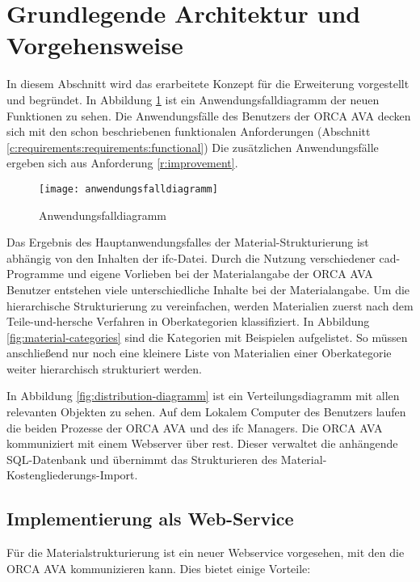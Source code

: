 \section{Grundlegende Architektur und Vorgehensweise}
\label{c:conception:architecture}
In diesem Abschnitt wird das erarbeitete Konzept für die Erweiterung vorgestellt und begründet. In Abbildung \ref{fig:usecasediagramm} ist ein Anwendungsfalldiagramm der neuen Funktionen zu sehen. Die Anwendungsfälle des Benutzers der ORCA AVA decken sich mit den schon beschriebenen funktionalen Anforderungen (Abschnitt \ref{c:requirements:requirements:functional}) Die zusätzlichen Anwendungsfälle ergeben sich aus Anforderung \ref{r:improvement}.

\begin{figure}[h]
	\centering
	\texttt{[image: anwendungsfalldiagramm]}
	\caption[Anwendungsfalldiagramm]{Anwendungsfalldiagramm}
	\label{fig:usecasediagramm}
\end{figure}

Das Ergebnis des Hauptanwendungsfalles der Material-Strukturierung ist abhängig von den Inhalten der \ac{ifc}-Datei. Durch die Nutzung verschiedener \ac{cad}-Programme und eigene Vorlieben bei der Materialangabe der ORCA AVA Benutzer entstehen viele unterschiedliche Inhalte bei der Materialangabe.
Um die hierarchische Strukturierung zu vereinfachen, werden Materialien zuerst nach dem \glqq Teile-und-hersche\grqq{} Verfahren in Oberkategorien klassifiziert. In Abbildung \ref{fig:material-categories} sind die Kategorien mit Beispielen aufgelistet. So müssen anschließend nur noch eine kleinere Liste von Materialien einer Oberkategorie weiter hierarchisch strukturiert werden.

In Abbildung \ref{fig:distribution-diagramm} ist ein Verteilungsdiagramm mit allen relevanten Objekten zu sehen. Auf dem Lokalem Computer des Benutzers laufen die beiden Prozesse der ORCA AVA und des \ac{ifc} Managers. Die ORCA AVA kommuniziert mit einem Webserver über \ac{rest}. Dieser verwaltet die anhängende SQL-Datenbank und übernimmt das Strukturieren des Material-Kostengliederungs-Import.

\subsection{Implementierung als Web-Service}
\label{c:conception:architecture:service}
Für die Materialstrukturierung ist ein neuer Webservice vorgesehen, mit den die ORCA AVA kommunizieren kann. Dies bietet einige Vorteile:

